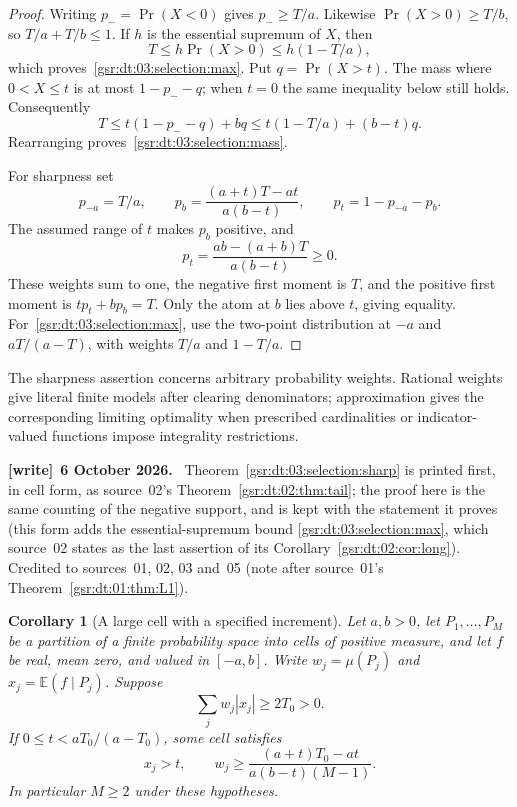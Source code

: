 \documentclass[11pt,letterpaper]{article}
\numberwithin{equation}{section}
\newtheorem{corollary}[theorem]{Corollary}
\theoremstyle{definition}
\theoremstyle{remark}
\newcommand{\E}{\mathbb E}
\newcommand{\1}{\mathbf 1}
\newenvironment{writenote}[1][]{\par\smallskip\begingroup\small
 \noindent\textbf{[write]}\if\relax\detokenize{#1}\relax\else~\textbf{#1.}\fi\ }%
 {\par\endgroup\smallskip}
\begin{document}
\begin{proof}
Writing $p_-=\Pr(X<0)$ gives $p_-\ge T/a$. Likewise
$\Pr(X>0)\ge T/b$, so $T/a+T/b\le1$. If $h$ is the essential supremum
of $X$, then
\[
 T\le h\Pr(X>0)\le h(1-T/a),
\]
which proves~\eqref{gsr:dt:03:selection:max}. Put $q=\Pr(X>t)$. The mass where
$0<X\le t$ is at most $1-p_--q$; when $t=0$ the same inequality below
still holds. Consequently
\[
 T\le t(1-p_--q)+bq
   \le t(1-T/a)+(b-t)q.
\]
Rearranging proves~\eqref{gsr:dt:03:selection:mass}.

For sharpness set
\[
 p_{-a}=T/a,\qquad
 p_b=\frac{(a+t)T-at}{a(b-t)},\qquad
 p_t=1-p_{-a}-p_b.
\]
The assumed range of $t$ makes $p_b$ positive, and
\[
 p_t=\frac{ab-(a+b)T}{a(b-t)}\ge0.
\]
These weights sum to one, the negative first moment is $T$, and the
positive first moment is $tp_t+bp_b=T$. Only the atom at $b$ lies above
$t$, giving equality. For~\eqref{gsr:dt:03:selection:max}, use the two-point
distribution at $-a$ and $aT/(a-T)$, with weights $T/a$ and $1-T/a$.
\end{proof}

The sharpness assertion concerns arbitrary probability weights. Rational
weights give literal finite models after clearing denominators; approximation
gives the corresponding limiting optimality when prescribed cardinalities
or indicator-valued functions impose integrality restrictions.
\begin{writenote}[6 October 2026]
Theorem~\ref{gsr:dt:03:selection:sharp} is printed first, in cell form, as source~02's Theorem~\ref{gsr:dt:02:thm:tail}; the proof here is the same counting of the negative support, and is kept with the statement it proves (this form adds the essential-supremum bound \eqref{gsr:dt:03:selection:max}, which source~02 states as the last assertion of its Corollary~\ref{gsr:dt:02:cor:long}). Credited to sources~01, 02, 03 and~05 (note after source~01's Theorem~\ref{gsr:dt:01:thm:L1}).
\end{writenote}

\begin{corollary}[A large cell with a specified increment]
\label{gsr:dt:03:selection:cell}
Let $a,b>0$, let $P_1,\ldots,P_M$ be a partition of a finite probability
space into cells of positive measure, and let $f$ be real, mean zero,
and valued in $[-a,b]$.
Write $w_j=\mu(P_j)$ and $x_j=\E(f\mid P_j)$. Suppose
\[
 \sum_j w_j|x_j|\ge 2T_0>0.
\]
If $0\le t<aT_0/(a-T_0)$, some cell satisfies
\begin{equation}
 x_j>t,\qquad
 w_j\ge\frac{(a+t)T_0-at}{a(b-t)(M-1)}.
 \label{gsr:dt:03:selection:cellbound}
\end{equation}
In particular $M\ge2$ under these hypotheses.
\end{corollary}
\end{document}

